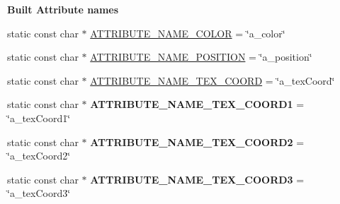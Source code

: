 \begin{Indent}\textbf{ Built Attribute names}\par
\begin{DoxyCompactItemize}
\item 
static const char $\ast$ \hyperlink{classGLProgram_a23088139c8644f7b8a1492003a7c1237}{A\+T\+T\+R\+I\+B\+U\+T\+E\+\_\+\+N\+A\+M\+E\+\_\+\+C\+O\+L\+OR} = \char`\"{}a\+\_\+color\char`\"{}
\item 
static const char $\ast$ \hyperlink{classGLProgram_ac321f223fdaa661549507312a297ffd1}{A\+T\+T\+R\+I\+B\+U\+T\+E\+\_\+\+N\+A\+M\+E\+\_\+\+P\+O\+S\+I\+T\+I\+ON} = \char`\"{}a\+\_\+position\char`\"{}
\item 
static const char $\ast$ \hyperlink{classGLProgram_a005f0e88a9bdb4ee7ea5a6ea3b6edac2}{A\+T\+T\+R\+I\+B\+U\+T\+E\+\_\+\+N\+A\+M\+E\+\_\+\+T\+E\+X\+\_\+\+C\+O\+O\+RD} = \char`\"{}a\+\_\+tex\+Coord\char`\"{}
\item 
\mbox{\label{classGLProgram_ab1696558ab6f18bddf7e01cabd743312}} 
static const char $\ast$ {\bfseries A\+T\+T\+R\+I\+B\+U\+T\+E\+\_\+\+N\+A\+M\+E\+\_\+\+T\+E\+X\+\_\+\+C\+O\+O\+R\+D1} = \char`\"{}a\+\_\+tex\+Coord1\char`\"{}
\item 
\mbox{\label{classGLProgram_ae4345c09cdff660130a2d4aea40117fb}} 
static const char $\ast$ {\bfseries A\+T\+T\+R\+I\+B\+U\+T\+E\+\_\+\+N\+A\+M\+E\+\_\+\+T\+E\+X\+\_\+\+C\+O\+O\+R\+D2} = \char`\"{}a\+\_\+tex\+Coord2\char`\"{}
\item 
\mbox{\label{classGLProgram_a12082af10019608cc3792eb13d7566cb}} 
static const char $\ast$ {\bfseries A\+T\+T\+R\+I\+B\+U\+T\+E\+\_\+\+N\+A\+M\+E\+\_\+\+T\+E\+X\+\_\+\+C\+O\+O\+R\+D3} = \char`\"{}a\+\_\+tex\+Coord3\char`\"{}
\end{DoxyCompactItemize}
\end{Indent}
